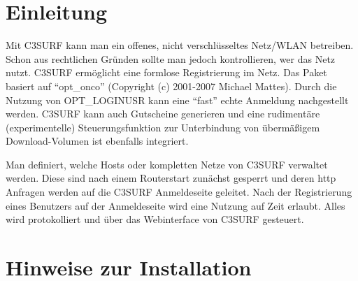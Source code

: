 \section{Einleitung}

Mit C3SURF kann man ein offenes, nicht verschlüsseltes Netz/WLAN betreiben. Schon
aus rechtlichen Gründen sollte man jedoch kontrollieren, wer das Netz nutzt.
C3SURF ermöglicht eine formlose Registrierung im Netz. Das Paket basiert
auf ``opt\_onco'' (Copyright (c) 2001-2007 Michael Mattes). Durch die
Nutzung von OPT\_LOGINUSR kann eine ``fast'' echte Anmeldung nachgestellt werden.
C3SURF kann auch Gutscheine generieren und eine rudimentäre (experimentelle)
Steuerungsfunktion zur Unterbindung von übermäßigem Download-Volumen ist
ebenfalls integriert.

Man definiert, welche Hosts oder kompletten Netze von C3SURF verwaltet
werden. Diese sind nach einem Routerstart zunächst gesperrt und
deren http Anfragen werden auf die C3SURF Anmeldeseite geleitet.
Nach der Registrierung eines Benutzers auf der Anmeldeseite wird
eine Nutzung auf Zeit erlaubt. Alles wird protokolliert und über
das Webinterface von C3SURF gesteuert.

\section {Hinweise zur Installation}


